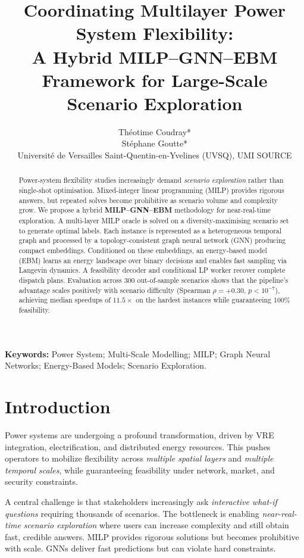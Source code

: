 \documentclass{article}
\title{Coordinating Multilayer Power System Flexibility:\\
A Hybrid MILP--GNN--EBM Framework for Large-Scale Scenario Exploration}
\author{Théotime Coudray* \\ Stéphane Goutte*\\[2pt]
\normalsize *Université de Versailles Saint-Quentin-en-Yvelines (UVSQ), UMI SOURCE}
\date{}
\let\parencite\citep
\begin{document}
\maketitle

\begin{abstract}
Power-system flexibility studies increasingly demand \emph{scenario exploration} rather than single-shot optimisation. Mixed-integer linear programming (MILP) provides rigorous answers, but repeated solves become prohibitive as scenario volume and complexity grow. We propose a hybrid \textbf{MILP--GNN--EBM} methodology for near-real-time exploration. A multi-layer MILP oracle is solved on a diversity-maximising scenario set to generate optimal labels. Each instance is represented as a heterogeneous temporal graph and processed by a topology-consistent graph neural network (GNN) producing compact embeddings. Conditioned on these embeddings, an energy-based model (EBM) learns an energy landscape over binary decisions and enables fast sampling via Langevin dynamics. A feasibility decoder and conditional LP worker recover complete dispatch plans. Evaluation across 300 out-of-sample scenarios shows that the pipeline's advantage scales positively with scenario difficulty (Spearman $\rho = +0.30$, $p < 10^{-7}$), achieving median speedups of $11.5\times$ on the hardest instances while guaranteeing 100\% feasibility.
\end{abstract}

\noindent\textbf{Keywords:} Power System; Multi-Scale Modelling; MILP; Graph Neural Networks; Energy-Based Models; Scenario Exploration.

\section{Introduction}

Power systems are undergoing a profound transformation, driven by VRE integration, electrification, and distributed energy resources. This pushes operators to mobilize flexibility across \emph{multiple spatial layers} and \emph{multiple temporal scales}, while guaranteeing feasibility under network, market, and security constraints.

A central challenge is that stakeholders increasingly ask \emph{interactive what-if questions} requiring thousands of scenarios. The bottleneck is enabling \emph{near-real-time scenario exploration} where users can increase complexity and still obtain fast, credible answers. MILP provides rigorous solutions \parencite{conejo_investment_2016} but becomes prohibitive with scale. GNNs deliver fast predictions but can violate hard constraints.
\end{document}
